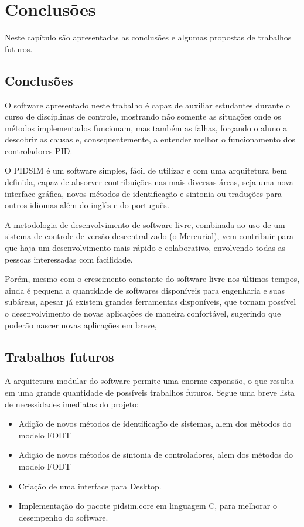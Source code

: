 \chapter{Conclusões \label{cap:conclusoes}}

Neste capítulo são apresentadas as conclusões e algumas propostas de
trabalhos futuros.

\section{Conclusões}

    O software apresentado neste trabalho é capaz de auxiliar estudantes
    durante o curso de disciplinas de controle, mostrando não somente
    as situações onde os métodos implementados funcionam, mas também as
    falhas, forçando o aluno a descobrir as causas e, consequentemente, a
    entender melhor o funcionamento dos controladores \acs{PID}.

    O PIDSIM é um software simples, fácil de utilizar e com uma arquitetura
    bem definida, capaz de absorver contribuições nas mais diversas áreas,
    seja uma nova interface gráfica, novos métodos de identificação
    e sintonia ou traduções para outros idiomas além do inglês e do português.
    
    A metodologia de desenvolvimento de software livre, combinada ao uso
    de um sistema de controle de versão descentralizado (o Mercurial), vem
    contribuir para que haja um desenvolvimento mais rápido e colaborativo,
    envolvendo todas as pessoas interessadas com facilidade.
    
    Porém, mesmo com o crescimento constante do software livre nos últimos tempos,
    ainda é pequena a quantidade de softwares disponíveis para engenharia
    e suas subáreas, apesar já existem grandes ferramentas disponíveis,
    que tornam possível o desenvolvimento de novas aplicações de maneira
    confortável, sugerindo que poderão nascer novas aplicações em breve,
    

\section{Trabalhos futuros}

    A arquitetura modular do software permite uma enorme expansão, o que
    resulta em uma grande quantidade de possíveis trabalhos futuros.
    Segue uma breve lista de necessidades imediatas do projeto:
    
    \begin{itemize}
        \item Adição de novos métodos de identificação de sistemas, alem dos
            métodos do modelo \acs{FODT}
        \item Adição de novos métodos de sintonia de controladores, alem dos
            métodos do modelo \acs{FODT}
        \item Criação de uma interface para Desktop.
        \item Implementação do pacote pidsim.core em linguagem C, para melhorar
            o desempenho do software.
    \end{itemize}
